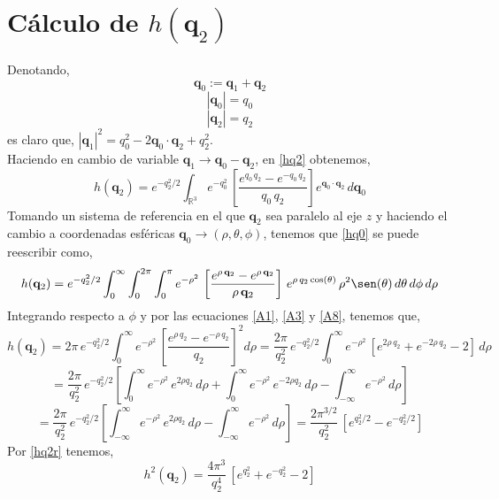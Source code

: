 \documentclass[12pt]{book}
\numberwithin{equation}{chapter}
\def\q{\mathbf{q}}
\def\R{\mathbb{R}}
\def\t{\theta}
\def\r{\rho}
\def\p{\phi}
\begin{document}
\section{C\'alculo de $h(\q_{2})$}
Denotando, 
$$\q_{0}:= \q_{1}+\q_{2} $$
$$|\q_{0}|=q_{0}$$ 
$$|\q_{2}|=q_{2}$$ 
es claro que, $ |\q_{1}|^{2}= q_{0}^{2} - 2\q_{0}\cdot \q_{2} + q_{2}^{2}  $.\\
Haciendo en cambio de variable $\q_{1} \rightarrow \q_{0}-\q_{2} $, en \eqref{hq2} obtenemos,
\begin{equation}\label{hq0}
h(\q_{2})= e^{-q_{2}^{2}/2} \int_{\R^{3}} e^{-q_{0}^{2}} \, \left[ \frac{e^{q_{0}\,q_{2}} - e^{-q_{0}\,q_{2}} }{q_{0}\, q_{2}} \right] e^{\q_{0}\cdot \q_{2}}\, d\q_{0}
\end{equation}
Tomando un sistema de referencia en el que $\q_{2}$ sea paralelo al eje $z$ y haciendo el cambio a coordenadas esf\'ericas $ \q_{0} \rightarrow (\r,\t,\p) $, tenemos que \eqref{hq0} se puede reescribir como,
\begin{equation}
h(\q_{2})= e^{-q_{2}^{2}/2} \int_{0}^{\infty} \int_{0}^{2\pi} \int_{0}^{\pi} e^{-\r^{2}}\, \left[ \frac{e^{\r\, \q_{2}} - e^{\r\, \q_{2}} }{\r \, \q_{2}} \right]\, e^{\r \, q_{2} \cos(\t)} \, \r^{2} \sen(\t) \, d\t \, d\p \, d\r
\end{equation}
Integrando respecto a $\p$ y por las ecuaciones \eqref{A1}, \eqref{A3} y \eqref{A8}, tenemos que, 
$$ h(\q_{2})= 2\pi \, e^{-q_{2}^{2}/2} \int_{0}^{\infty} e^{-\r^{2}}\, \left[ \frac{e^{\r\, q_{2}} - e^{-\r\, q_{2}} }{q_{2}} \right]^{2} d\r = \frac{2\pi}{q_{2}^{2}} \, e^{-q_{2}^{2}/2} \int_{0}^{\infty} e^{-\r^{2}}\, \left[ e^{2\r\, q_{2}} + e^{-2\r\, q_{2}} -2 \right] \, d\r $$
$$=\frac{2\pi}{q_{2}^{2}} \, e^{-q_{2}^{2}/2} \left[\int_{0}^{\infty} e^{-\r^{2}}\, e^{2\r q_{2}}\, d\r + \int_{0}^{\infty} e^{-\r^{2}}\, e^{-2\r q_{2}}\, d\r - \int_{-\infty}^{\infty} e^{-\r^{2}}\, d\r \right] $$
\begin{equation}\label{hq2r}
=\frac{2\pi}{q_{2}^{2}} \, e^{-q_{2}^{2}/2} \left[\int_{-\infty}^{\infty} e^{-\r^{2}}\, e^{2\r q_{2}}\, d\r - \int_{-\infty}^{\infty} e^{-\r^{2}}\, d\r \right]= \frac{2 \pi^{3/2}}{q_{2}^{2}} \, \left[e^{q_{2}^{2}/2} - e^{-q_{2}^{2}/2}  \right]
\end{equation}
Por \eqref{hq2r} tenemos,
\begin{equation}\label{hq22}
h^{2}(\q_{2})=\frac{4\pi^{3}}{q_{2}^{4}} \, \left[ e^{q_{2}^{2}} + e^{-q_{2}^{2}} -2 \right]
\end{equation}
\end{document}
